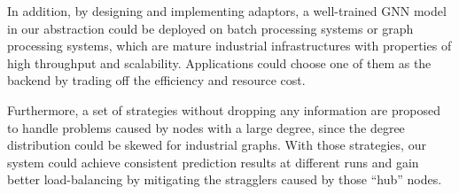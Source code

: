 \documentclass[conference]{IEEEtran}
\begin{document}


In addition, by designing and implementing adaptors, a well-trained GNN model in our abstraction could be deployed on batch processing systems or graph processing systems, which are mature industrial infrastructures with properties of high throughput and scalability.
Applications could choose one of them as the backend by trading off the efficiency and resource cost.

Furthermore, a set of strategies without dropping any information are proposed to handle problems caused by nodes with a large degree, since the degree distribution could be skewed for industrial graphs.
With those strategies, our system could achieve consistent prediction results at different runs and gain better load-balancing by mitigating the stragglers caused by those ``hub'' nodes.

\end{document}
